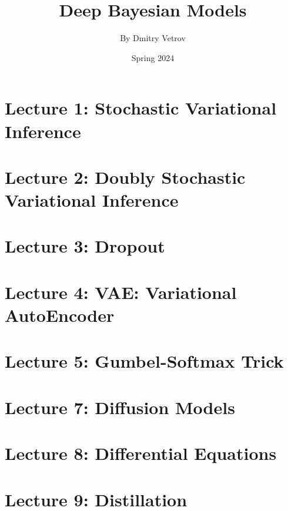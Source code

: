 \documentclass[a4paper]{article}
\title{Deep Bayesian Models}
\author{By Dmitry Vetrov}
\date{Spring 2024}
\begin{document}
\maketitle

\tableofcontents

\newpage
\setlength{\parindent}{0pt}

\section{Lecture 1: Stochastic Variational Inference}



\newpage

\section{Lecture 2: Doubly Stochastic Variational Inference}



\newpage

\section{Lecture 3: Dropout}



\newpage

\section{Lecture 4: VAE: Variational AutoEncoder}



\newpage

\section{Lecture 5: Gumbel-Softmax Trick}



\newpage

\section{Lecture 7: Diffusion Models}



\newpage

\section{Lecture 8: Differential Equations}



\newpage

\section{Lecture 9: Distillation}


\end{document}

